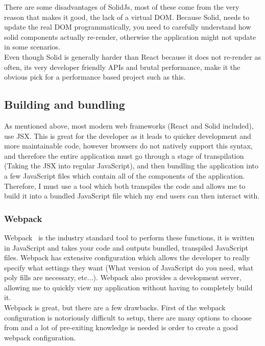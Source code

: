 \documentclass[titlepage]{article}
\begin{document}
There are some disadvantages of SolidJs, most of these come from the very reason that makes it good, the lack of a virtual DOM. Because Solid, needs to update the real DOM programmatically, you need to carefully understand how solid components actually re-render, otherwise the application might not update in some scenarios. \\

Even though Solid is generally harder than React because it does not re-render as often, its very developer friendly APIs and brutal performance, make it the obvious pick for a performance based project such as this.

\subsection{Building and bundling}
As mentioned above, most modern web frameworks (React and Solid included), use JSX. This is great for the developer as it leads to quicker development and more maintainable code, however browsers do not natively support this syntax, and therefore the entire application must go through a stage of transpilation (Taking the JSX into regular JavaScript), and then bundling the application into a few JavaScript files which contain all of the components of the application. Therefore, I must use a tool which both transpiles the code and allows me to build it into a bundled JavaScript file which my end users can then interact with.

\subsubsection{Webpack}
Webpack~\cite{webpack} is the industry standard tool to perform these functions, it is written in JavaScript and takes your code and outputs bundled, transpiled JavaScript files. Webpack has extensive configuration which allows the developer to really specify what settings they want (What version of JavaScript do you need, what poly fills are necessary, etc...). Webpack also provides a development server, allowing me to quickly view my application without having to completely build it. \\

Webpack is great, but there are a few drawbacks. First of the webpack configuration is notoriously difficult to setup, there are many options to choose from and a lot of pre-exiting knowledge is needed is order to create a good webpack configuration. \\
\end{document}
